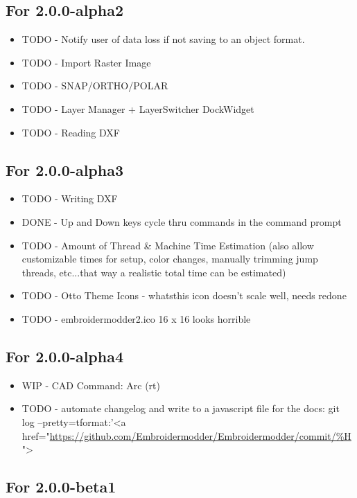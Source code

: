\subsection{For 2.0.0-alpha2}

\begin{itemize}
\item TODO - Notify user of data loss if not saving to an object format.
\item TODO - Import Raster Image
\item TODO - SNAP/ORTHO/POLAR
\item TODO - Layer Manager + LayerSwitcher DockWidget
\item TODO - Reading DXF
\end{itemize}

\subsection{For 2.0.0-alpha3}

\begin{itemize}
\item TODO - Writing DXF
\item DONE - Up and Down keys cycle thru commands in the command prompt
\item TODO - Amount of Thread \& Machine Time Estimation (also allow customizable times for setup, color changes, manually trimming jump threads, etc...that way a realistic total time can be estimated)
\item TODO - Otto Theme Icons - whatsthis icon doesn't scale well, needs redone
\item TODO - embroidermodder2.ico 16 x 16 looks horrible
\end{itemize}

\subsection{For 2.0.0-alpha4}

\begin{itemize}
\item WIP - CAD Command: Arc (rt)
\item TODO - automate changelog and write to a javascript file for the docs: git log --pretty=tformat:'<a href="\url{https://github.com/Embroidermodder/Embroidermodder/commit/%H}">%
\end{itemize}

\subsection{For 2.0.0-beta1}

